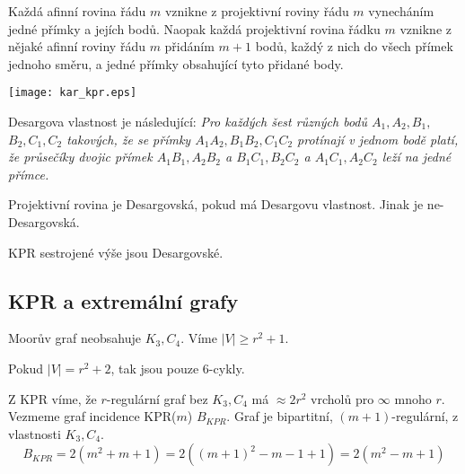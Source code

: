 \begin{consequence}
    Každá afinní rovina řádu $m$ vznikne z projektivní roviny řádu $m$ vynecháním jedné přímky a jejích bodů.
    Naopak každá projektivní rovina řádku $m$ vznikne z nějaké afinní roviny řádu $m$ přidáním $m+1$ bodů, každý z nich do všech přímek jednoho směru, a jedné přímky obsahující tyto přidané body.

	\texttt{[image: kar\_kpr.eps]}
\end{consequence}
\begin{definition}
    Desargova vlastnost je následující: \emph{Pro každých šest různých bodů $A_1, A_2, B_1,$ $B_2, C_1, C_2$ takových, že se přímky $A_1A_2, B_1B_2, C_1C_2$ protínají v jednom bodě platí, že průsečíky dvojic přímek $A_1B_1, A_2B_2$ a $B_1C_1, B_2C_2$ a $A_1C_1, A_2C_2$ leží na jedné přímce.}

    Projektivní rovina je Desargovská, pokud má Desargovu vlastnost. Jinak je ne-Desargovská.
\end{definition}
\begin{exercise}
    KPR sestrojené výše jsou Desargovské.
\end{exercise}

\subsection{KPR a extremální grafy}

\begin{example}
	Moorův graf neobsahuje $K_3, C_4$.
	Víme $|V| \geq r^2 + 1$.

	Pokud $|V| = r^2 + 2$, tak jsou pouze 6-cykly.

	Z KPR víme, že $r$-regulární graf bez $K_3, C_4$ má $\approx 2r^2$ vrcholů pro $\infty$ mnoho $r$.
	Vezmeme graf incidence KPR($m$) $B_{KPR}$.
	Graf je bipartitní, $(m + 1)$-regulární, z vlastnosti $K_3, C_4$.
	\[ B_{KPR} = 2(m^2 + m + 1) = 2((m + 1)^2 - m - 1 + 1) = 2(m^2 - m + 1) \]
\end{example}

